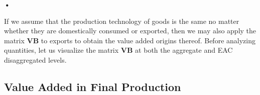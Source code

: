 \textbf{\textbf{•}}\documentclass[a4paper]{article}
\begin{document}
If we assume that the production technology of goods is the same no matter whether they are domestically consumed or exported, then we may also apply the matrix \textbf{VB} to exports to obtain the value added origins thereof. Before analyzing quantities, let us visualize the matrix \textbf{VB} at both the aggregate and EAC disaggregated levels. \newline

\subsection{Value Added in Final Production}





%
\end{document}
